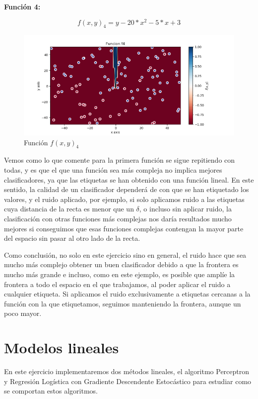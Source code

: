 \documentclass[12pt, spanish]{article}
\begin{document}
\textbf{Función 4:} 

$$ f(x, y)_4 = y - 20*x^2 -5*x +3  $$

\begin{figure}[H]
  \centering
      \includegraphics[scale = 0.70]{ej1-3-f4.png}
 		 \caption{Función $f(x, y)_4$}
  		\label{fig:ej1-f4}

\end{figure}


Vemos como lo que comente para la primera función se sigue repitiendo con todas, y es que el que una función sea más compleja no implica mejores clasificadores, ya que las etiquetas se han obtenido con una función lineal. En este sentido, la calidad de un clasificador dependerá de con que se han etiquetado los valores, y el ruido aplicado, por ejemplo, si solo aplicamos ruido a las etiquetas cuya distancia de la recta es menor que un $\delta$, o incluso sin aplicar ruido,  la clasificación con otras funciones más complejas nos daría resultados mucho mejores si conseguimos que esas funciones complejas contengan la mayor parte del espacio sin pasar al otro lado de la recta.

Como conclusión, no solo en este ejercicio sino en general, el ruido hace que sea mucho más complejo obtener un buen clasificador debido a que la frontera es mucho más grande e incluso, como en este ejemplo, es posible que amplíe la frontera a todo el espacio en el que trabajamos, al poder aplicar el ruido a cualquier etiqueta. Si aplicamos el ruido exclusivamente a etiquetas cercanas a la función con la que etiquetamos, seguimos manteniendo la frontera, aunque un poco mayor.

\newpage

\section{Modelos lineales}

En este ejercicio implementaremos dos métodos lineales, el algoritmo Perceptron y Regresión Logística con Gradiente Descendente Estocástico para estudiar como se comportan estos algoritmos.
\end{document}
